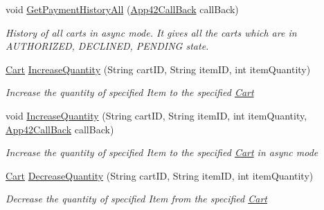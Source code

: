 \begin{DoxyCompactItemize}
void \hyperlink{classcom_1_1shephertz_1_1app42_1_1paas_1_1sdk_1_1csharp_1_1shopping_1_1_cart_service_a187b250a55dfbcdd91b11b9e5ee24505}{Get\+Payment\+History\+All} (\hyperlink{interfacecom_1_1shephertz_1_1app42_1_1paas_1_1sdk_1_1csharp_1_1_app42_call_back}{App42\+Call\+Back} call\+Back)
\begin{DoxyCompactList}\small\item\em History of all carts in async mode. It gives all the carts which are in A\+U\+T\+H\+O\+R\+I\+Z\+E\+D, D\+E\+C\+L\+I\+N\+E\+D, P\+E\+N\+D\+I\+N\+G state. \end{DoxyCompactList}\item 
\hyperlink{classcom_1_1shephertz_1_1app42_1_1paas_1_1sdk_1_1csharp_1_1shopping_1_1_cart}{Cart} \hyperlink{classcom_1_1shephertz_1_1app42_1_1paas_1_1sdk_1_1csharp_1_1shopping_1_1_cart_service_a7da92d7648623ac043918772dd74ed66}{Increase\+Quantity} (String cart\+I\+D, String item\+I\+D, int item\+Quantity)
\begin{DoxyCompactList}\small\item\em Increase the quantity of specified Item to the specified \hyperlink{classcom_1_1shephertz_1_1app42_1_1paas_1_1sdk_1_1csharp_1_1shopping_1_1_cart}{Cart} \end{DoxyCompactList}\item 
void \hyperlink{classcom_1_1shephertz_1_1app42_1_1paas_1_1sdk_1_1csharp_1_1shopping_1_1_cart_service_ad08e6b730adbf0e00b08b5308aededf1}{Increase\+Quantity} (String cart\+I\+D, String item\+I\+D, int item\+Quantity, \hyperlink{interfacecom_1_1shephertz_1_1app42_1_1paas_1_1sdk_1_1csharp_1_1_app42_call_back}{App42\+Call\+Back} call\+Back)
\begin{DoxyCompactList}\small\item\em Increase the quantity of specified Item to the specified \hyperlink{classcom_1_1shephertz_1_1app42_1_1paas_1_1sdk_1_1csharp_1_1shopping_1_1_cart}{Cart} in async mode \end{DoxyCompactList}\item 
\hyperlink{classcom_1_1shephertz_1_1app42_1_1paas_1_1sdk_1_1csharp_1_1shopping_1_1_cart}{Cart} \hyperlink{classcom_1_1shephertz_1_1app42_1_1paas_1_1sdk_1_1csharp_1_1shopping_1_1_cart_service_acc0d487b2ad166946d408242dc00dabd}{Decrease\+Quantity} (String cart\+I\+D, String item\+I\+D, int item\+Quantity)
\begin{DoxyCompactList}\small\item\em Decrease the quantity of specified Item from the specified \hyperlink{classcom_1_1shephertz_1_1app42_1_1paas_1_1sdk_1_1csharp_1_1shopping_1_1_cart}{Cart} \end{DoxyCompactList}\item 

\end{DoxyCompactItemize}
